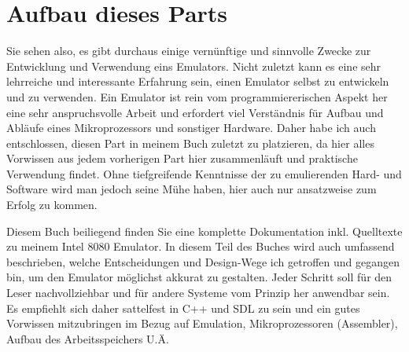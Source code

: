 \documentclass[b5paper,10pt,dvips,fleqn,titlepage,twoside]{book}
\begin{document}
\section{Aufbau dieses Parts}
Sie sehen also, es gibt durchaus einige vernünftige und sinnvolle Zwecke zur Entwicklung und Verwendung eins Emulators.
Nicht zuletzt kann es eine sehr lehrreiche und interessante Erfahrung sein, einen Emulator selbst zu entwickeln und zu verwenden. Ein Emulator ist rein vom programmiererischen Aspekt her eine sehr anspruchsvolle Arbeit und erfordert viel Verständnis für Aufbau und Abläufe eines Mikroprozessors und sonstiger Hardware. Daher habe ich auch entschlossen, diesen Part in meinem Buch zuletzt zu platzieren, da hier alles Vorwissen aus jedem vorherigen Part hier zusammenläuft und praktische Verwendung findet. Ohne tiefgreifende Kenntnisse der zu emulierenden Hard- und Software wird man jedoch seine Mühe haben, hier auch nur ansatzweise zum Erfolg zu kommen.

Diesem Buch beiliegend finden Sie eine komplette Dokumentation inkl. Quelltexte zu meinem Intel 8080 Emulator. In diesem Teil des Buches wird auch umfassend beschrieben, welche Entscheidungen und Design-Wege ich getroffen und gegangen bin, um den Emulator möglichst akkurat zu gestalten. Jeder Schritt soll für den Leser nachvollziehbar und für andere Systeme vom Prinzip her anwendbar sein.\newline
Es empfiehlt sich daher sattelfest in C++ und SDL zu sein und ein gutes Vorwissen mitzubringen im Bezug auf Emulation, Mikroprozessoren (Assembler), Aufbau des Arbeitsspeichers U.Ä.
\end{document}
